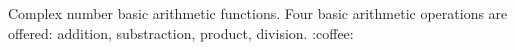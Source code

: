 Complex number basic arithmetic functions. Four basic arithmetic operations are offered\+: addition, substraction, product, division. \+:coffee\+: 
